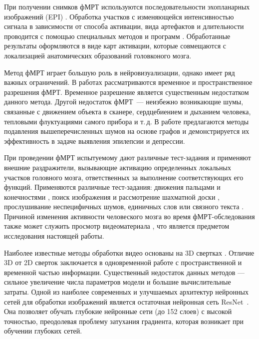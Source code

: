 \documentclass[a4paper, 12pt]{extarticle}
\begin{document}
При получении снимков фМРТ используются последовательности
эхопланарных изображений (EPI) \citep{Connelly1993, Kwong1992, Ogawa1992}.
Обработка участков с изменяющейся интенсивностью сигнала в
зависимости от способа активации, вида артефактов и длительности
проводится с помощью специальных методов и программ 
\citep{Bandettini1992, BAUDENDISTEL1995701, COX1996162}.
Обработанные результаты оформляются в виде карт активации,
которые совмещаются с локализацией анатомических образований
головконого мозга.

Метод фМРТ играет большую роль в нейровизуализации, однако имеет ряд важных ограничений.
В работах \citep{menon1999spatial, logothetis2008we} рассматриваются
временное и пространственное разрешения фМРТ. Временное разрешение является существенным
недостатком данного метода. Другой недостаток фМРТ~--- неизбежно возникающие шумы,
связанные с движением объекта в сканере, сердцебиением и дыханием человека, тепловыми
флуктуациями самого прибора и т.\,д. В работе \citep{1804.10167} предлагаются методы
подавления вышеперечисленных шумов на основе графов и демонстрируется их эффективность в задаче
выявления эпилепсии и депрессии.

При проведении фМРТ испытуемому дают различные тест-задания и
применяют внешние раздражители, вызывающие активацию определенных
локальных участков головного мозга, ответственных за выполнение
соответствующих его функций.
Применяются различные тест-задания: движения пальцами и конечностями
\citep{Roux1998, Papke1999}, поиск изображения и рассмотрение
шахматной доски \citep{Engel1994, Schneider1994},
прослушивание неспецифичных шумов, единичных слов
или связного текста \citep{Binder1994, Dymarkowski1998}.
Причиной изменения активности человеского мозга во время фМРТ-обследования
также может служить просмотр видеоматериала \citep{decety1997brain},
что является предметом исследования настоящей работы. 

Наиболее известные методы обработки видео основаны на 3D свертках \citep{tran2015learning}.
Отличие 3D от 2D сверток заключается в одновременной работе с пространственной и временной частью
информации. Существенный недостаток данных методов — сильное увеличение числа параметров модели и
большие вычислительные затраты. Одной из наиболее современных и улучшаемых архитектур
нейронных сетей для обработки изображений является остаточная нейронная сеть ResNet~\citep{he2015deep}.
Она позволяет обучать глубокие нейронные сети (до 152 слоев) с высокой точностью,
преодолевая проблему затухания градиента, которая возникает при обучении глубоких сетей.
\end{document}

